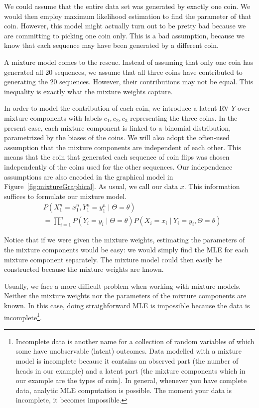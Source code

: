 \documentclass[11pt,leqno,a4paper]{report}\usepackage[]{graphicx}\usepackage[]{color}
\begin{document}
We could assume that the entire data set was generated by exactly one coin. We would then employ maximum likelihood estimation 
to find the parameter of that coin. However, this model might actually turn out to be
pretty bad because we are committing to picking one coin only. This is
a bad assumption, because we know that each sequence may have been generated by a different coin. 

A mixture model comes to the rescue. Instead of assuming that only one coin has generated all 20 sequences,
we assume that all three coins have contributed to generating the 20 sequences. However, their contributions
may not be equal. This inequality is exactly what the mixture weights capture. 

In order to model the contribution of each coin, we introduce a latent RV $ Y $ over mixture components with labels $ c_{1}, c_{2}, c_{3} $ representing the three coins.
In the present case, each mixture component is linked to a binomial distribution, parametrized by the biases of
the coins. We will also adopt the often-used assumption
that the mixture components are independent of each other. This means that the coin that generated each
sequence of coin flips was chosen independently of the coins used for the other sequences. Our independence assumptions
are also encoded in the graphical model in Figure~\eqref{fig:mixtureGraphical}. As usual, we call our data $ x $. 
This information suffices to formulate our mixture model.
\begin{align} 
&P(X_1^n=x_{1}^{n},Y_{1}^{n}=y_{1}^{n}\mid \Theta=\theta) \label{eq:mixtureExample} \\
&= \prod_{i=1}^{n} P(Y_{i}= y_{i} \mid \Theta=\theta)P(X_{i}=x_{i} \mid Y_{i}=y_{i},\Theta=\theta) \nonumber 
\end{align}

Notice that if we were given the mixture weights, estimating
the parameters of the mixture components would be easy: we would simply find the MLE for each mixture component separately. The mixture
model could then easily be constructed because the mixture weights are known. 

Usually, we face a more difficult problem when working with mixture models. Neither the mixture
weights nor the parameters of the mixture components are known. In this case, doing straighforward MLE is impossible because the data is
incomplete\footnote{Incomplete data is 
  another name for a collection of random variables of which some have unobservable (latent) outcomes. Data modelled with a mixture model is incomplete because it contains
  an observed part (the number of heads in our example) and a latent
  part (the mixture components which in our example are the types of coin). In general, whenever you have complete data, analytic MLE computation is possible. The moment your data is incomplete, it becomes impossible.}. 
\end{document}
